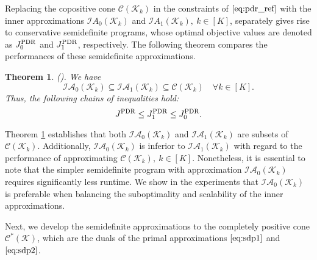 \documentclass{article}
\newtheorem{theorem}{Theorem}
\begin{document}
Replacing the copositive cone $\mathcal C(\mathcal K_k)$ in the constraints of $\eqref{eq:pdr_ref}$ with the inner approximations $\mathcal IA_0 (\mathcal K_k)$ and $\mathcal IA_1 (\mathcal K_k), \ k \in [K]$, separately gives rise to conservative semidefinite programs, whose optimal objective values are denoted as $J^{\textup{PDR}}_0$ and $J^{\textup{PDR}}_1$, respectively. The following theorem compares the performances of these semidefinite approximations.
\begin{theorem} \textup{(\cite[Proposition 1 and 3]{MSRO-decision-rules}).} \label{thm4} We have 
\begin{equation*}
    \mathcal{IA}_0 (\mathcal K_k) \subseteq \mathcal{IA}_1 (\mathcal K_k) \subseteq \mathcal{C}(\mathcal K_k) \quad \forall k \in [K].
\end{equation*} 
Thus, the following chains of inequalities hold: 
\begin{equation*}
    J^{\textup{PDR}} \leq J^{\textup{PDR}}_1 \leq J^{\textup{PDR}}_0.
\end{equation*}  
\end{theorem}
Theorem \ref{thm4} establishes that both $\mathcal{IA}_0 (\mathcal K_k)$ and $\mathcal{IA}_1 (\mathcal K_k)$ are subsets of $\mathcal{C}(\mathcal K_k)$. Additionally, $\mathcal{IA}_0 (\mathcal K_k)$ is inferior to $\mathcal{IA}_1 (\mathcal K_k)$ with regard to the performance of approximating $\mathcal{C}(\mathcal K_k), \ k \in [K]$. 
Nonetheless, it is essential to note that the simpler semidefinite program with approximation $\mathcal{IA}_0 (\mathcal K_k)$ requires significantly less runtime. %
We show in the experiments that $\mathcal{IA}_0 (\mathcal K_k)$ is preferable when balancing the suboptimality and scalability of the inner approximations. 

Next, we develop the semidefinite approximations to the completely positive cone  $\mathcal{C^*(K)}$, which are the duals of the primal approximations $\eqref{eq:sdp1}$ and $\eqref{eq:sdp2}$.
\end{document}

